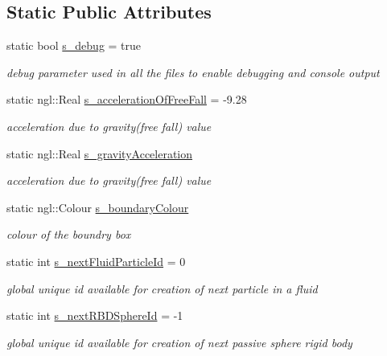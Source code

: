 \subsection*{Static Public Attributes}
\begin{DoxyCompactItemize}
\item 
static bool \hyperlink{class_simulation_parameters_a39c16940451c8d0ad3039112cf27f35c}{s\_\-debug} = true
\begin{DoxyCompactList}\small\item\em debug parameter used in all the files to enable debugging and console output \item\end{DoxyCompactList}\item 
static ngl::Real \hyperlink{class_simulation_parameters_a7e0162b56c6960d1aceb3a88ee3326e3}{s\_\-accelerationOfFreeFall} = -\/9.28
\begin{DoxyCompactList}\small\item\em acceleration due to gravity(free fall) value \item\end{DoxyCompactList}\item 
static ngl::Real \hyperlink{class_simulation_parameters_aa1a876c641060bd6d04306cf5aaf37d1}{s\_\-gravityAcceleration}
\begin{DoxyCompactList}\small\item\em acceleration due to gravity(free fall) value \item\end{DoxyCompactList}\item 
static ngl::Colour \hyperlink{class_simulation_parameters_a8dcb13bd6eaf80cbc5cc06de425d4024}{s\_\-boundaryColour}
\begin{DoxyCompactList}\small\item\em colour of the boundry box \item\end{DoxyCompactList}\item 
static int \hyperlink{class_simulation_parameters_a5d179885ab04a975dbc4f054b8ee22a1}{s\_\-nextFluidParticleId} = 0
\begin{DoxyCompactList}\small\item\em global unique id available for creation of next particle in a fluid \item\end{DoxyCompactList}\item 
static int \hyperlink{class_simulation_parameters_ab66f45e106c43304340f7a5341b380b4}{s\_\-nextRBDSphereId} = -\/1
\begin{DoxyCompactList}\small\item\em global unique id available for creation of next passive sphere rigid body \item\end{DoxyCompactList}\end{DoxyCompactItemize}
